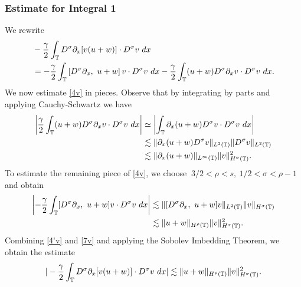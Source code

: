 \subsubsection{Estimate for Integral 1}
We rewrite
\begin{equation}
\begin{split}
  & -\frac{\gamma}{2} \int_{\mathbb{T}} D^\sigma \partial_x [v(u+w)] \cdot
D^\sigma v \ dx
\\
& = -\frac{\gamma}{2} \int_{\mathbb{T}} \left[ D^\sigma \partial_x, \ u+w \right]v \cdot
D^\sigma v \ dx - \frac{\gamma}{2} \int_{\mathbb{T}} (u+w) D^\sigma
\partial_x v \cdot D^\sigma v\ dx.
\label{4v}
\end{split}
\end{equation}
We now estimate \eqref{4v} in pieces. Observe that by integrating by parts
and applying Cauchy-Schwartz we have
\begin{equation}
\begin{split}
\left | \frac{\gamma}{2}\int_{\mathbb{T}} (u+w) D^\sigma \partial_x v \cdot
D^\sigma v \ dx \right |
& \simeq \left |  \int_{\mathbb{T}} \partial_x (u+w) D^\sigma v
\cdot D^\sigma v \ dx \right |
\\
& \lesssim \|\partial_x (u+w) D^\sigma v \|_{L^2(\mathbb{T})} \|D^\sigma
v\|_{L^2(\mathbb{T})}
\\
& \lesssim \|\partial_x (u+w)\|_{L^\infty(\mathbb{T})}
\|v\|_{H^\sigma(\mathbb{T})}^2.
\label{4'v}
\end{split}
\end{equation}
To estimate the remaining piece of \eqref{4v}, we choose $\ 3/2 < \rho
< s,  \ 1/2< \sigma <\rho -1$ and obtain
\begin{equation}
\begin{split}
\left | -\frac{\gamma}{2} \int_{\mathbb{T}} [D^\sigma \partial_x, \ u+w] v
\cdot D^\sigma v \ dx \right |
& \lesssim \|[D^\sigma \partial_x, \ u+w]v\|_{L^2(\mathbb{T})}
\|v\|_{H^\sigma(\mathbb{T})} \\
& \lesssim \|u+w\|_{H^\rho(\mathbb{T})} \|v\|_{H^\sigma(\mathbb{T})}^2.
\label{7v}
\end{split}
\end{equation}
Combining \eqref{4'v} and \eqref{7v} and applying the Sobolev Imbedding
Theorem, we obtain the estimate
\begin{equation}
\begin{split}
 |-\frac{\gamma}{2} \int_{\mathbb{T}} D^\sigma \partial_x [v(u+w)] \cdot
D^\sigma v \ dx|
\lesssim \|u+w\|_{H^\rho(\mathbb{T})} \|v\|_{H^\sigma(\mathbb{T})}^2.
\label{8v}
\end{split}
\end{equation}

